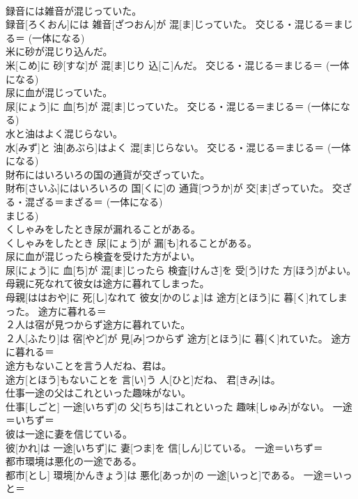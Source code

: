 \documentclass[8pt]{extreport}
\begin{document}
\begin{CJK}{UTF8}{min}
\\	録音には雑音が混じっていた。	
\\	録音[ろくおん]には 雑音[ざつおん]が 混[ま]じっていた。	交じる・混じる＝まじる＝ (一体になる) 
\\	米に砂が混じり込んだ。	
\\	米[こめ]に 砂[すな]が 混[ま]じり 込[こ]んだ。	交じる・混じる＝まじる＝ (一体になる) 
\\	尿に血が混じっていた。	
\\	尿[にょう]に 血[ち]が 混[ま]じっていた。	交じる・混じる＝まじる＝ (一体になる) 
\\	水と油はよく混じらない。	
\\	水[みず]と 油[あぶら]はよく 混[ま]じらない。	交じる・混じる＝まじる＝ (一体になる) 
\\	財布にはいろいろの国の通貨が交ざっていた。	
\\	財布[さいふ]にはいろいろの 国[くに]の 通貨[つうか]が 交[ま]ざっていた。	交ざる・混ざる＝まざる＝ (一体になる) 
\\	まじる)
\\	くしゃみをしたとき尿が漏れることがある。	
\\	くしゃみをしたとき 尿[にょう]が 漏[も]れることがある。	
\\	尿に血が混じったら検査を受けた方がよい。	
\\	尿[にょう]に 血[ち]が 混[ま]じったら 検査[けんさ]を 受[う]けた 方[ほう]がよい。	
\\	母親に死なれて彼女は途方に暮れてしまった。	
\\	母親[ははおや]に 死[し]なれて 彼女[かのじょ]は 途方[とほう]に 暮[く]れてしまった。	途方に暮れる＝ 
\\	２人は宿が見つからず途方に暮れていた。	
\\	２人[ふたり]は 宿[やど]が 見[み]つからず 途方[とほう]に 暮[く]れていた。	途方に暮れる＝ 
\\	途方もないことを言う人だね、君は。	
\\	途方[とほう]もないことを 言[い]う 人[ひと]だね、 君[きみ]は。	
\\	仕事一途の父はこれといった趣味がない。	
\\	仕事[しごと] 一途[いちず]の 父[ちち]はこれといった 趣味[しゅみ]がない。	一途＝いちず＝ 
\\	彼は一途に妻を信じている。	
\\	彼[かれ]は 一途[いちず]に 妻[つま]を 信[しん]じている。	一途＝いちず＝ 
\\	都市環境は悪化の一途である。	
\\	都市[とし] 環境[かんきょう]は 悪化[あっか]の 一途[いっと]である。	一途＝いっと＝ 

\end{CJK}
\end{document}
